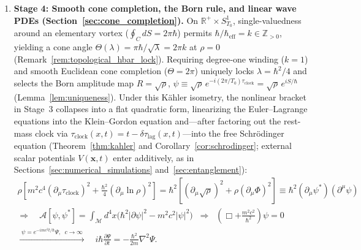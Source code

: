 \documentclass[11pt, a4paper]{article}
\theoremstyle{definition}
\begin{document}
\begin{enumerate}[label=\textbf{\arabic*.}, leftmargin=0.95cm, itemsep=0.55em]
    \item \textbf{Stage 4: Smooth cone completion, the Born rule, and linear wave PDEs (Section~\ref{sec:cone_completion}).} On $\mathbb{R}^+ \times S^1_{T_0}$, single-valuedness around an elementary vortex ($\oint_C dS = 2\pi\hbar$) permits $\hbar/\hbar_{\text{eff}} = k \in \mathbb{Z}_{>0}$, yielding a cone angle $\Theta(\lambda) = \pi\hbar/\sqrt{\lambda} = 2\pi k$ at $\rho = 0$ (Remark~\ref{rem:topological_hbar_lock}). Requiring degree-one winding ($k = 1$) and smooth Euclidean cone completion ($\Theta = 2\pi$) uniquely locks $\lambda = \hbar^2/4$ and selects the Born amplitude map $R = \sqrt{\rho}$, $\psi \equiv \sqrt{\rho}\,e^{-i(2\pi/T_0)\tau_{\text{clock}}} = \sqrt{\rho}\,e^{iS/\hbar}$ (Lemma~\ref{lem:uniqueness}). Under this K\"{a}hler isometry, the nonlinear bracket in Stage~3 collapses into a flat quadratic form, linearizing the Euler--Lagrange equations into the Klein--Gordon equation and---after factoring out the rest-mass clock via $\tau_{\text{clock}}(x,t) = t - \delta\tau_{\text{lag}}(x,t)$---into the free Schr\"{o}dinger equation (Theorem~\ref{thm:kahler} and Corollary~\ref{cor:schrodinger}; external scalar potentials $V(\mathbf{x}, t)$ enter additively, as in Sections~\ref{sec:numerical_simulations} and~\ref{sec:entanglement}):
    \begin{gather*}
    \rho\left[m^2 c^4(\partial_\mu\tau_{\text{clock}})^2 + \frac{\hbar^2}{4}(\partial_\mu\ln\rho)^2\right]
    = \hbar^2\left[(\partial_\mu\sqrt{\rho})^2 + \rho(\partial_\mu\Phi)^2\right] \equiv \hbar^2(\partial_\mu\psi^*)(\partial^\mu\psi) \\
    \Longrightarrow\quad \mathcal{A}[\psi, \psi^*] = \int_{\mathcal{M}} d^4x\Big(\hbar^2|\partial\psi|^2 - m^2 c^2|\psi|^2\Big)
    \;\;\Longrightarrow\;\; \left(\Box + \frac{m^2 c^2}{\hbar^2}\right)\psi = 0 \\
    \xrightarrow{\;\psi = e^{-imc^2 t/\hbar}\Psi,\;\; c\to\infty\;}\quad
    i\hbar\frac{\partial\Psi}{\partial t} = -\frac{\hbar^2}{2m}\nabla^2\Psi.
    \end{gather*}


\end{enumerate}
\end{document}
